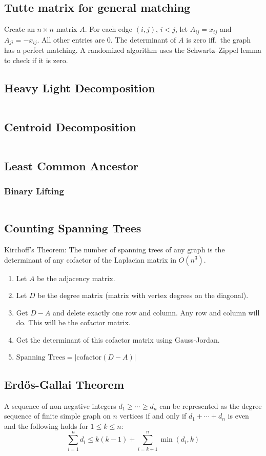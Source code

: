 \documentclass[8pt,a4paper,landscape,oneside]{amsart}
\newcommand{\code}[1]{\inputminted[fontsize=\normalsize,baselinestretch=1]{cpp}{_code/#1}}
\begin{document}
\begin{multicols*}{3}
  \subsection{Tutte matrix for general matching}
    Create an $n\times n$ matrix $A$. For each edge $(i,j)$, $i<j$, let
    $A_{ij} = x_{ij}$ and $A_{ji} = -x_{ij}$. All other entries are $0$.
    The determinant of $A$ is zero iff.\ the graph has a perfect matching.
    A randomized algorithm uses the Schwartz--Zippel lemma to check if it is
    zero.
  \subsection{Heavy Light Decomposition}
    \code{graphs/heavy_light_decomposition.cpp}
	\subsection{Centroid Decomposition}
    \code{graphs/centroid_decomposition.cpp}
	\subsection{Least Common Ancestor}
		\subsubsection{Binary Lifting}
      \code{graphs/lca/binary_lifting.cpp}
  \subsection{Counting Spanning Trees}
    Kirchoff's Theorem: The number of spanning trees of any graph is the
    determinant of any cofactor of the Laplacian matrix in $O(n^3)$.
    \begin{enumerate}
        \item Let $A$ be the adjacency matrix.
        \item Let $D$ be the degree matrix (matrix with vertex degrees on the diagonal).
        \item Get $D-A$ and delete exactly one row and column. Any row and
        column will do. This will be the cofactor matrix.
        \item Get the determinant of this cofactor matrix using Gauss-Jordan.
        \item $\text{Spanning Trees} = \left|\mathrm{cofactor}(D-A) \right|$
    \end{enumerate}
  \subsection{Erd\H{o}s-Gallai Theorem}
    A sequence of non-negative integers $d_1 \ge \cdots \ge d_n$ can be represented as the
    degree sequence of finite simple graph on $n$ vertices if and only if $d_1 + \cdots + d_n$ is
    even and the following holds for $1 \le k \le n$:
    \[
    \sum_{i=1}^n d_i \le k(k-1) + \sum_{i=k+1}^n \min\left(d_i, k\right)
    \]

\end{multicols*}
\end{document}
